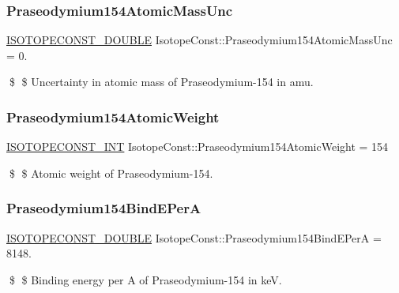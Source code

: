 \subsubsection{\texorpdfstring{Praseodymium154\+Atomic\+Mass\+Unc}{Praseodymium154AtomicMassUnc}}
{\footnotesize\ttfamily \mbox{\hyperlink{group___isotope_const-_macros_ga8f45a7272ce02c0b4c65c44636ed719a}{I\+S\+O\+T\+O\+P\+E\+C\+O\+N\+S\+T\+\_\+\+D\+O\+U\+B\+LE}} Isotope\+Const\+::\+Praseodymium154\+Atomic\+Mass\+Unc = 0.}

\$ \$ Uncertainty in atomic mass of Praseodymium-\/154 in amu. \mbox{\label{group___isotope_const-_praseodymium-_pr154_ga7c949f7bb98c71fa87766cd60c363be3}} 
\subsubsection{\texorpdfstring{Praseodymium154\+Atomic\+Weight}{Praseodymium154AtomicWeight}}
{\footnotesize\ttfamily \mbox{\hyperlink{group___isotope_const-_macros_ga5f18360b3e99483a35c32d789e62621c}{I\+S\+O\+T\+O\+P\+E\+C\+O\+N\+S\+T\+\_\+\+I\+NT}} Isotope\+Const\+::\+Praseodymium154\+Atomic\+Weight = 154}

\$ \$ Atomic weight of Praseodymium-\/154. \mbox{\label{group___isotope_const-_praseodymium-_pr154_gac3553e7d46a83839ac74b33fa33a32b4}} 
\subsubsection{\texorpdfstring{Praseodymium154\+Bind\+E\+PerA}{Praseodymium154BindEPerA}}
{\footnotesize\ttfamily \mbox{\hyperlink{group___isotope_const-_macros_ga8f45a7272ce02c0b4c65c44636ed719a}{I\+S\+O\+T\+O\+P\+E\+C\+O\+N\+S\+T\+\_\+\+D\+O\+U\+B\+LE}} Isotope\+Const\+::\+Praseodymium154\+Bind\+E\+PerA = 8148.}

\$ \$ Binding energy per A of Praseodymium-\/154 in keV. \mbox{\label{group___isotope_const-_praseodymium-_pr154_gae7e291dc5bd3253ef3bccea48a91dc56}} 
